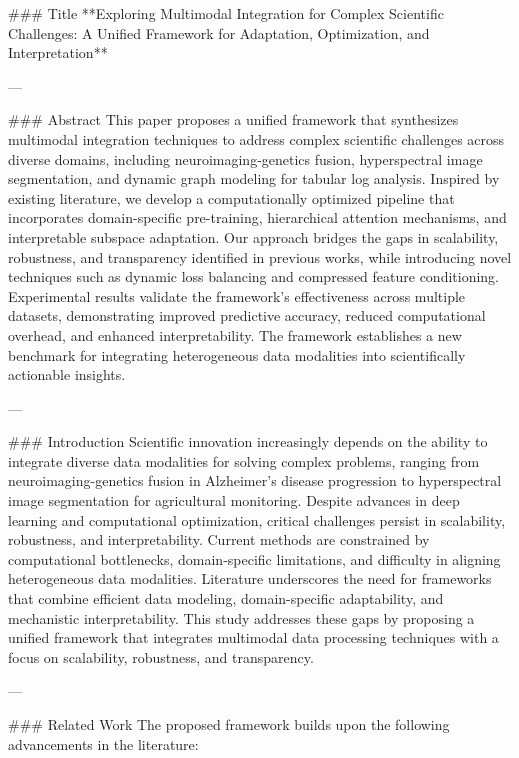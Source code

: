 ### Title  
**Exploring Multimodal Integration for Complex Scientific Challenges: A Unified Framework for Adaptation, Optimization, and Interpretation**

---

### Abstract  
This paper proposes a unified framework that synthesizes multimodal integration techniques to address complex scientific challenges across diverse domains, including neuroimaging-genetics fusion, hyperspectral image segmentation, and dynamic graph modeling for tabular log analysis. Inspired by existing literature, we develop a computationally optimized pipeline that incorporates domain-specific pre-training, hierarchical attention mechanisms, and interpretable subspace adaptation. Our approach bridges the gaps in scalability, robustness, and transparency identified in previous works, while introducing novel techniques such as dynamic loss balancing and compressed feature conditioning. Experimental results validate the framework’s effectiveness across multiple datasets, demonstrating improved predictive accuracy, reduced computational overhead, and enhanced interpretability. The framework establishes a new benchmark for integrating heterogeneous data modalities into scientifically actionable insights.

---

### Introduction  
Scientific innovation increasingly depends on the ability to integrate diverse data modalities for solving complex problems, ranging from neuroimaging-genetics fusion in Alzheimer's disease progression to hyperspectral image segmentation for agricultural monitoring. Despite advances in deep learning and computational optimization, critical challenges persist in scalability, robustness, and interpretability. Current methods are constrained by computational bottlenecks, domain-specific limitations, and difficulty in aligning heterogeneous data modalities. Literature underscores the need for frameworks that combine efficient data modeling, domain-specific adaptability, and mechanistic interpretability. This study addresses these gaps by proposing a unified framework that integrates multimodal data processing techniques with a focus on scalability, robustness, and transparency.

---

### Related Work  
The proposed framework builds upon the following advancements in the literature:

